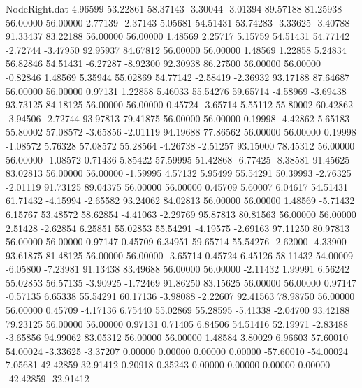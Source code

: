\begin{filecontents}{NodeRight.dat}
   4.96599   53.22861   58.37143    -3.30044   -3.01394   89.57188   81.25938   56.00000   56.00000    2.77139   -2.37143
   5.05681   54.51431   53.74283    -3.33625   -3.40788   91.33437   83.22188   56.00000   56.00000    1.48569    2.25717
   5.15759   54.51431   54.77142    -2.72744   -3.47950   92.95937   84.67812   56.00000   56.00000    1.48569    1.22858
   5.24834   56.82846   54.51431    -6.27287   -8.92300   92.30938   86.27500   56.00000   56.00000   -0.82846    1.48569
   5.35944   55.02869   54.77142    -2.58419   -2.36932   93.17188   87.64687   56.00000   56.00000    0.97131    1.22858
   5.46033   55.54276   59.65714    -4.58969   -3.69438   93.73125   84.18125   56.00000   56.00000    0.45724   -3.65714
   5.55112   55.80002   60.42862    -3.94506   -2.72744   93.97813   79.41875   56.00000   56.00000    0.19998   -4.42862
   5.65183   55.80002   57.08572    -3.65856   -2.01119   94.19688   77.86562   56.00000   56.00000    0.19998   -1.08572
   5.76328   57.08572   55.28564    -4.26738   -2.51257   93.15000   78.45312   56.00000   56.00000   -1.08572    0.71436
   5.85422   57.59995   51.42868    -6.77425   -8.38581   91.45625   83.02813   56.00000   56.00000   -1.59995    4.57132
   5.95499   55.54291   50.39993    -2.76325   -2.01119   91.73125   89.04375   56.00000   56.00000    0.45709    5.60007
   6.04617   54.51431   61.71432    -4.15994   -2.65582   93.24062   84.02813   56.00000   56.00000    1.48569   -5.71432
   6.15767   53.48572   58.62854    -4.41063   -2.29769   95.87813   80.81563   56.00000   56.00000    2.51428   -2.62854
   6.25851   55.02853   55.54291    -4.19575   -2.69163   97.11250   80.97813   56.00000   56.00000    0.97147    0.45709
   6.34951   59.65714   55.54276    -2.62000   -4.33900   93.61875   81.48125   56.00000   56.00000   -3.65714    0.45724
   6.45126   58.11432   54.00009    -6.05800   -7.23981   91.13438   83.49688   56.00000   56.00000   -2.11432    1.99991
   6.56242   55.02853   56.57135    -3.90925   -1.72469   91.86250   83.15625   56.00000   56.00000    0.97147   -0.57135
   6.65338   55.54291   60.17136    -3.98088   -2.22607   92.41563   78.98750   56.00000   56.00000    0.45709   -4.17136
   6.75440   55.02869   55.28595    -5.41338   -2.04700   93.42188   79.23125   56.00000   56.00000    0.97131    0.71405
   6.84506   54.51416   52.19971    -2.83488   -3.65856   94.99062   83.05312   56.00000   56.00000    1.48584    3.80029
   6.96603   57.60010   54.00024    -3.33625   -3.37207    0.00000    0.00000    0.00000    0.00000  -57.60010  -54.00024
   7.05681   42.42859   32.91412     0.20918    0.35243    0.00000    0.00000    0.00000    0.00000  -42.42859  -32.91412

\end{filecontents}
